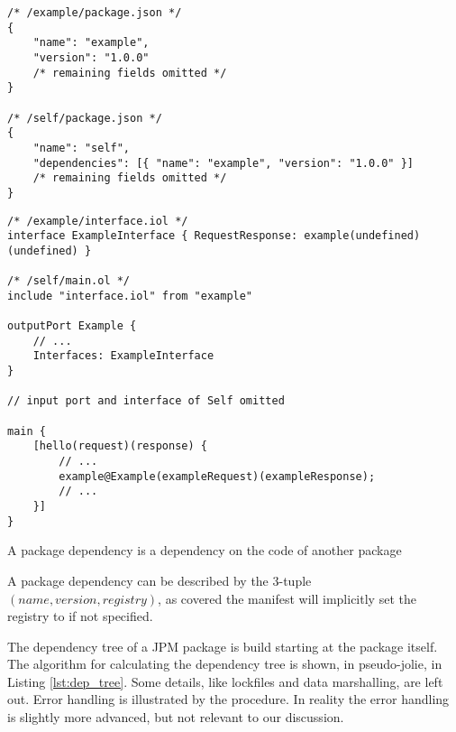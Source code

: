 \begin{listing}[H]
\begin{verbatim}
/* /example/package.json */
{
    "name": "example",
    "version": "1.0.0"
    /* remaining fields omitted */
}

/* /self/package.json */
{
    "name": "self",
    "dependencies": [{ "name": "example", "version": "1.0.0" }]
    /* remaining fields omitted */
}
\end{verbatim}

\begin{verbatim}
/* /example/interface.iol */
interface ExampleInterface { RequestResponse: example(undefined)(undefined) }

/* /self/main.ol */
include "interface.iol" from "example"

outputPort Example {
    // ...
    Interfaces: ExampleInterface
}

// input port and interface of Self omitted

main {
    [hello(request)(response) {
        // ...
        example@Example(exampleRequest)(exampleResponse);
        // ...
    }]
}
\end{verbatim}
\caption{A package dependency is a dependency on the code of another package}
\label{lst:jolie_dep_package}
\end{listing}

A package dependency can be described by the 3-tuple $(name, version,
registry)$, as covered the manifest will implicitly set the registry to
 if not specified.

The dependency tree of a JPM package is build starting at the package itself.
The algorithm for calculating the dependency tree is shown, in pseudo-jolie, in
Listing \ref{lst:dep_tree}. Some details, like lockfiles and data marshalling,
are left out. Error handling is illustrated by the 
procedure. In reality the error handling is slightly more advanced, but
not relevant to our discussion.

